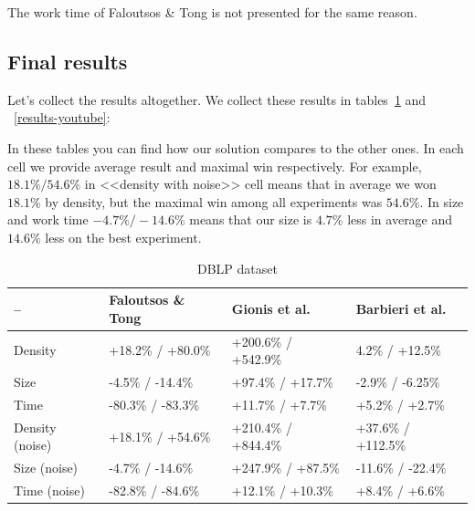 The work time of Faloutsos \& Tong \cite{Faloutsos06} is not presented for the same reason.

\subsection{Final results}

Let's collect the results altogether. We collect these results in tables~\ref{results-dblp} and ~\ref{results-youtube}:

In these tables you can find how our solution compares to the other ones. In each cell we provide average result and maximal win respectively. For example, $18.1\%/54.6\%$ in <<density with noise>> cell means that in average we won $18.1\%$ by density, but the maximal win among all experiments was $54.6\%$. In size and work time $-4.7\%/-14.6\%$ means that our size is $4.7\%$ less in average and $14.6\%$ less on the best experiment.

\begin{table}[!h]
\centering
\caption{DBLP dataset}\label{results-dblp}
  \begin{tabular}{| l | l | l | p{4cm} |}
  \hline
  -- & Faloutsos \& Tong & Gionis et al. & Barbieri et al. \\\hline
  Density         & +18.2\% / +80.0\% & +200.6\% / +542.9\% & 4.2\%   / +12.5\%  \\\hline
  Size            & -4.5\%  / -14.4\% & +97.4\%  / +17.7\%  & -2.9\%  / -6.25\%  \\\hline
  Time            & -80.3\% / -83.3\% & +11.7\%  / +7.7\%   & +5.2\%  / +2.7\%   \\\hline
  Density (noise) & +18.1\% / +54.6\% & +210.4\% / +844.4\% & +37.6\% / +112.5\% \\\hline
  Size (noise)    & -4.7\%  / -14.6\% & +247.9\% / +87.5\%  & -11.6\% / -22.4\%  \\\hline
  Time (noise)    & -82.8\% / -84.6\% & +12.1\%  / +10.3\%  & +8.4\%  / +6.6\%   \\\hline
  \end{tabular}
\end{table}
\FloatBarrier

